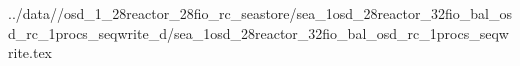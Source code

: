 ../data//osd_1_28reactor_28fio_rc_seastore/sea_1osd_28reactor_32fio_bal_osd_rc_1procs_seqwrite_d/sea_1osd_28reactor_32fio_bal_osd_rc_1procs_seqwrite.tex